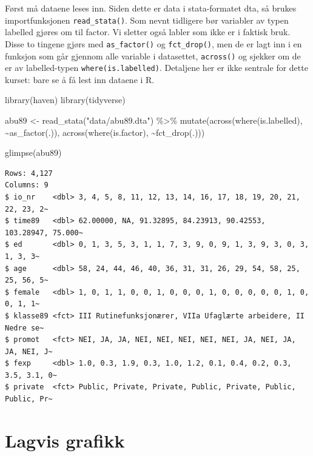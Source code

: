 \documentclass[
  letterpaper,
  DIV=11,
  numbers=noendperiod]{scrreprt}
\newenvironment{Shaded}{\begin{snugshade}}{\end{snugshade}}
\newcommand{\FunctionTok}[1]{\textcolor[rgb]{0.28,0.35,0.67}{#1}}
\newcommand{\NormalTok}[1]{\textcolor[rgb]{0.00,0.23,0.31}{#1}}
\newcommand{\OtherTok}[1]{\textcolor[rgb]{0.00,0.23,0.31}{#1}}
\newcommand{\SpecialCharTok}[1]{\textcolor[rgb]{0.37,0.37,0.37}{#1}}
\newcommand{\StringTok}[1]{\textcolor[rgb]{0.13,0.47,0.30}{#1}}
\theoremstyle{definition}
\theoremstyle{remark}
\begin{document}
Først må dataene leses inn. Siden dette er data i stata-formatet dta, så
brukes importfunksjonen \texttt{read\_stata()}. Som nevnt tidligere bør
variabler av typen labelled gjøres om til factor. Vi sletter også labler
som ikke er i faktisk bruk. Disse to tingene gjørs med
\texttt{as\_factor()} og \texttt{fct\_drop()}, men de er lagt inn i en
funksjon som går gjennom alle variable i datasettet, \texttt{across()}
og sjekker om de er av labelled-typen \texttt{where(is.labelled)}.
Detaljene her er ikke sentrale for dette kurset: bare se å få lest inn
dataene i R.

\begin{Shaded}
\begin{Highlighting}[]
\FunctionTok{library}\NormalTok{(haven)}
\FunctionTok{library}\NormalTok{(tidyverse)}

\NormalTok{abu89 }\OtherTok{\textless{}{-}} \FunctionTok{read\_stata}\NormalTok{(}\StringTok{"data/abu89.dta"}\NormalTok{) }\SpecialCharTok{\%\textgreater{}\%} 
  \FunctionTok{mutate}\NormalTok{(}\FunctionTok{across}\NormalTok{(}\FunctionTok{where}\NormalTok{(is.labelled), }\SpecialCharTok{\textasciitilde{}}\FunctionTok{as\_factor}\NormalTok{(.)),}
         \FunctionTok{across}\NormalTok{(}\FunctionTok{where}\NormalTok{(is.factor), }\SpecialCharTok{\textasciitilde{}}\FunctionTok{fct\_drop}\NormalTok{(.)))}

\FunctionTok{glimpse}\NormalTok{(abu89)}
\end{Highlighting}
\end{Shaded}

\begin{verbatim}
Rows: 4,127
Columns: 9
$ io_nr    <dbl> 3, 4, 5, 8, 11, 12, 13, 14, 16, 17, 18, 19, 20, 21, 22, 23, 2~
$ time89   <dbl> 62.00000, NA, 91.32895, 84.23913, 90.42553, 103.28947, 75.000~
$ ed       <dbl> 0, 1, 3, 5, 3, 1, 1, 7, 3, 9, 0, 9, 1, 3, 9, 3, 0, 3, 1, 3, 3~
$ age      <dbl> 58, 24, 44, 46, 40, 36, 31, 31, 26, 29, 54, 58, 25, 25, 56, 5~
$ female   <dbl> 1, 0, 1, 1, 0, 0, 1, 0, 0, 0, 1, 0, 0, 0, 0, 0, 1, 0, 0, 1, 1~
$ klasse89 <fct> III Rutinefunksjonærer, VIIa Ufaglærte arbeidere, II Nedre se~
$ promot   <fct> NEI, JA, JA, NEI, NEI, NEI, NEI, NEI, JA, NEI, JA, JA, NEI, J~
$ fexp     <dbl> 1.0, 0.3, 1.9, 0.3, 1.0, 1.2, 0.1, 0.4, 0.2, 0.3, 3.5, 3.1, 0~
$ private  <fct> Public, Private, Private, Public, Private, Public, Public, Pr~
\end{verbatim}

\hypertarget{lagvis-grafikk}{%
\section{Lagvis grafikk}\label{lagvis-grafikk}}
\end{document}
